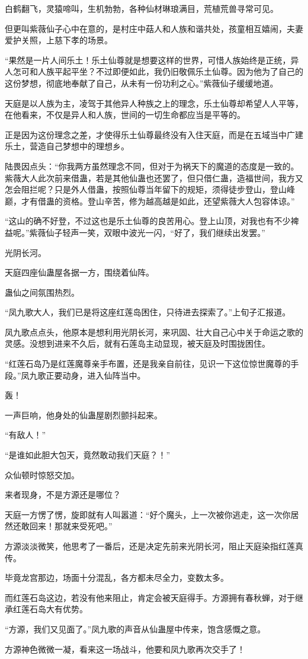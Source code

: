 \begin{this_body}
白鹤翻飞，灵猿啼叫，生机勃勃，各种仙材琳琅满目，荒植荒兽寻常可见。

但更叫紫薇仙子心中在意的，是村庄中菇人和人族和谐共处，孩童相互嬉闹，夫妻爱护关照，上慈下孝的场景。

“果然是一片人间乐土！乐土仙尊就是想要这样的世界，可惜人族始终是正统，异人怎可和人族平起平坐？不过即便如此，我仍旧敬佩乐土仙尊。因为他为了自己的这份梦想，彻底地奉献了自己，从未有一份功利之心。”紫薇仙子缓缓地道。

天庭是以人族为主，凌驾于其他异人种族之上的理念，乐土仙尊却希望人人平等，在他看来，不仅是异人和人族，世间的一切生命都应当是平等的。

正是因为这份理念之差，才使得乐土仙尊最终没有入住天庭，而是在五域当中广建乐土，营造自己梦想中的理想乡。

陆畏因点头：“你我两方虽然理念不同，但对于为祸天下的魔道的态度是一致的。紫薇大人此次前来借蛊，若是其他仙蛊也还罢了，但只借仁蛊，造福世间，我方又怎会阻拦呢？只是外人借蛊，按照仙尊当年留下的规矩，须得徒步登山，登山峰巅，才有借蛊的资格。登山辛苦，修为越高越是如此，还望紫薇大人包容体谅。”

“这山的确不好登，不过这也是乐土仙尊的良苦用心。登上山顶，对我也有不少裨益呢。”紫薇仙子轻声一笑，双眼中波光一闪，“好了，我们继续出发罢。”

光阴长河。

天庭四座仙蛊屋各据一方，围绕着仙阵。

蛊仙之间氛围热烈。

“凤九歌大人，我们已是将这座红莲岛困住，只待进去探索了。”上旬子汇报道。

凤九歌点点头，他原本是想利用光阴长河，来巩固、壮大自己心中关于命运之歌的灵感。没想到进来不久后，就有石莲岛主动显现，被天庭及时围拢困住。

“红莲石岛乃是红莲魔尊亲手布置，还是我亲自前往，见识一下这位惊世魔尊的手段。”凤九歌正要动身，进入仙阵当中。

轰！

一声巨响，他身处的仙蛊屋剧烈颤抖起来。

“有敌人！”

“是谁如此胆大包天，竟然敢动我们天庭？！”

众仙顿时惊怒交加。

来者现身，不是方源还是哪位？

天庭一方愣了愣，旋即就有人叫嚣道：“好个魔头，上一次被你逃走，这一次你居然还敢回来！那就来受死吧。”

方源淡淡微笑，他思考了一番后，还是决定先前来光阴长河，阻止天庭染指红莲真传。

毕竟龙宫那边，场面十分混乱，各方都未尽全力，变数太多。

而红莲石岛这边，若没有他来阻止，肯定会被天庭得手。方源拥有春秋蝉，对于继承红莲石岛大有优势。

“方源，我们又见面了。”凤九歌的声音从仙蛊屋中传来，饱含感慨之意。

方源神色微微一凝，看来这一场战斗，他要和凤九歌再次交手了！

\end{this_body}

